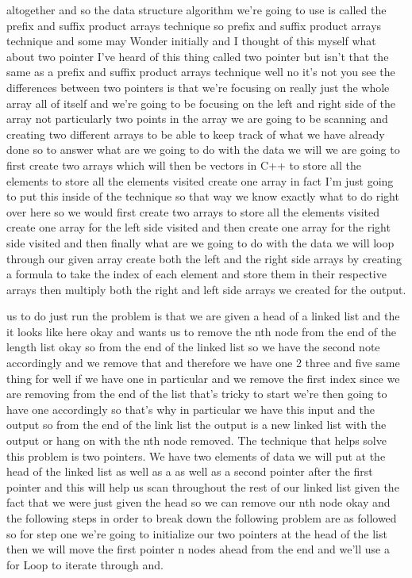 
\expandafter\def\csname sourceexcerpt@50\endcsname{%
altogether and so the data structure algorithm we're going to use is called the prefix
and suffix product arrays technique so prefix and suffix product arrays technique and
some may Wonder initially and I thought of this myself what about two pointer I've
heard of this thing called two pointer but isn't that the same as a prefix and suffix
product arrays technique well no it's not you see the differences between two pointers
is that we're focusing on really just the whole array all of itself and we're going to
be focusing on the left and right side of the array not particularly two points in the
array we are going to be scanning and creating two different arrays to be able to keep
track of what we have already done so to answer what are we going to do with the data
we will we are going to first create two arrays which will then be vectors in C++ to
store all the elements to store all the elements visited create one array in fact I'm
just going to put this inside of the technique so that way we know exactly what to do
right over here so we would first create two arrays to store all the elements visited
create one array for the left side visited and then create one array for the right
side visited and then finally what are we going to do with the data we will loop
through our given array create both the left and the right side arrays by creating a
formula to take the index of each element and store them in their respective arrays
then multiply both the right and left side arrays we created for the output.
}

\expandafter\def\csname sourceexcerpt@51\endcsname{%
us to do just run the problem is that we are given a head of a linked list and the it
looks like here okay and wants us to remove the nth node from the end of the length
list okay so from the end of the linked list so we have the second note accordingly and
we remove that and therefore we have one 2 three and five same thing for well if we
have one in particular and we remove the first index since we are removing from the
end of the list that's tricky to start we're then going to have one accordingly so
that's why in particular we have this input and the output so from the end of the link
list the output is a new linked list with the output or hang on with the nth node
removed. The technique that helps solve this problem is two pointers. We have
two elements of data we will put at the head of the linked list as well as a as well
as a second pointer after the first pointer and this will help us scan throughout the
rest of our linked list given the fact that we were just given the head so we can remove
our nth node okay and the following steps in order to break down the following problem
are as followed so for step one we're going to initialize our two pointers at the head
of the list then we will move the first pointer n nodes ahead from the end and we'll
use a for Loop to iterate through and.
}

